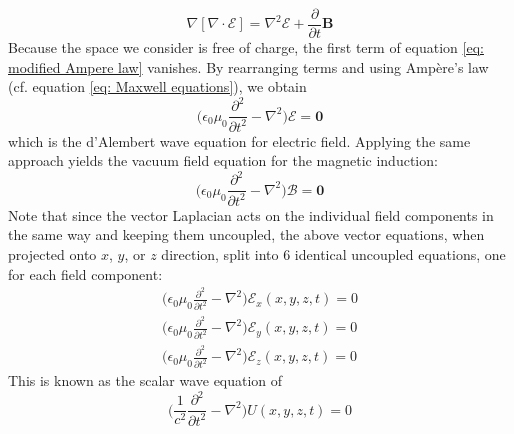 \documentclass{iucr}              %
\begin{document}
\begin{equation}\label{eq: modified Ampere law}
	\nabla[\nabla\cdot\bm{\mathcal{E}}]=\nabla^2\bm{\mathcal{E}}+\frac{\partial}{\partial t}\bm{B}
\end{equation} 
Because the space we consider is free of charge, the first term of equation \ref{eq: modified Ampere law} vanishes. By rearranging terms and using Amp\`{e}re's law (cf. equation \ref{eq: Maxwell equations}), we obtain
\begin{equation}\label{eq: d'Alembert electric field}
	\Big(\epsilon_0 \mu_0 \frac{\partial^2}{\partial t^2}-\nabla^2\Big) \bm{\mathcal{E}} = \bm{0}
\end{equation}
which is the d'Alembert wave equation for electric field. Applying the same approach yields the vacuum field equation for the magnetic induction:
\begin{equation}\label{eq: d'Alembert magnetic field}
\Big(\epsilon_0 \mu_0 \frac{\partial^2}{\partial t^2}-\nabla^2\Big) \bm{\mathcal{B}} = \bm{0}
\end{equation}
Note that since the vector Laplacian acts on the individual field components in the same way and keeping them uncoupled, the above vector equations, when projected onto $x$, $y$, or $z$ direction, split into 6 identical uncoupled equations, one for each field component:
\begin{align}
\Big(\epsilon_0 \mu_0 \frac{\partial^2}{\partial t^2}-\nabla^2\Big) \mathcal{E}_x(x,y,z,t) = 0\nonumber\\
\Big(\epsilon_0 \mu_0 \frac{\partial^2}{\partial t^2}-\nabla^2\Big) \mathcal{E}_y(x,y,z,t) = 0\nonumber \\ 
\Big(\epsilon_0 \mu_0 \frac{\partial^2}{\partial t^2}-\nabla^2\Big) \mathcal{E}_z(x,y,z,t) = 0
\end{align}
This is known as the scalar wave equation of
\begin{equation}\label{eq: d'Alembert scalar field}
\Big(\frac{1}{c^2} \frac{\partial^2}{\partial t^2}-\nabla^2\Big) U(x,y,z,t) = 0
\end{equation}
\end{document}

